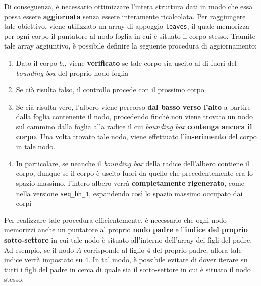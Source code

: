 \documentclass[12pt]{report}
\begin{document}
    Di conseguenza, è necessario ottimizzare l'intera struttura dati in modo che essa possa essere \textbf{aggiornata} senza essere interamente ricalcolata. Per raggiungere tale obiettivo, viene utilizzato un array di appoggio \texttt{leaves}, il quale memorizza per ogni corpo il puntatore al nodo foglia in cui è situato il corpo stesso. Tramite tale array aggiuntivo, è possibile definire la seguente procedura di aggiornamento:
    \begin{enumerate}
        \item Dato il corpo $b_i$, viene \textbf{verificato} se tale corpo sia uscito al di fuori del \textit{bounding box} del proprio nodo foglia
        \item Se ciò risulta falso, il controllo procede con il prossimo corpo
        \item Se cià risulta vero, l'albero viene percorso \textbf{dal basso verso l'alto} a partire dalla foglia contenente il nodo, procedendo finché non viene trovato un nodo sul cammino dalla foglia alla radice il cui \textit{bounding box} \textbf{contenga ancora il corpo}. Una volta trovato tale nodo, viene effettuato l'\textbf{inserimento} del corpo in tale nodo.
        \item In particolare, se neanche il \textit{bounding box} della radice dell'albero contiene il corpo, dunque se il corpo è uscito fuori da quello che precedentemente era lo spazio massimo, l'intero albero verrà \textbf{completamente rigenerato}, come nella versione \texttt{seq\_bh\_1}, espandendo così lo spazio massimo occupato dai corpi
    \end{enumerate}
    
    Per realizzare tale procedura efficientemente, è necessario che ogni nodo memorizzi anche un puntatore al proprio \textbf{nodo padre} e l'\textbf{indice del proprio sotto-settore} in cui tale nodo è situato all'interno dell'array dei figli del padre. Ad esempio, se il nodo $A$ corrisponde al figlio $4$ del proprio padre, allora tale indice verrà impostato su $4$. In tal modo, è possibile evitare di dover iterare su tutti i figli del padre in cerca di quale sia il sotto-settore in cui è situato il nodo stesso.
\end{document}
